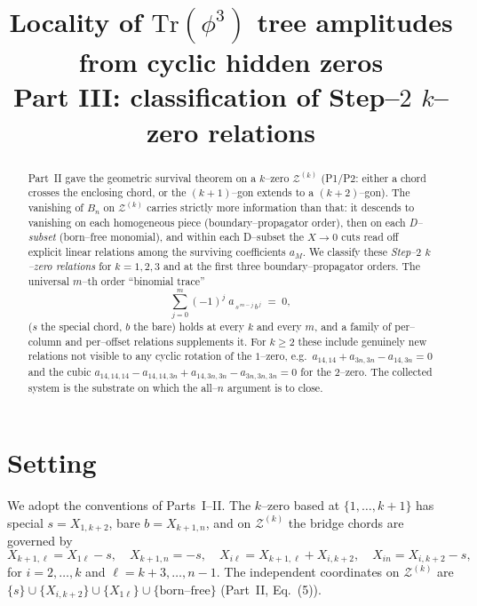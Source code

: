 \documentclass[11pt]{article}
\title{\vspace{-1.2em}Locality of $\mathrm{Tr}(\phi^3)$ tree amplitudes from cyclic hidden zeros\\[2pt]
\large Part III: classification of Step--$2$ $k$--zero relations}
\date{}
\author{}
\theoremstyle{definition}
\newcommand{\Z}{\mathcal{Z}}
\newcommand{\X}[1]{X_{#1}}
\begin{document}
\maketitle
\vspace{-3.2em}

\begin{abstract}
\noindent Part~II gave the geometric survival theorem on a $k$--zero $\Z^{(k)}$ (P1/P2: either a
chord crosses the enclosing chord, or the $(k{+}1)$--gon extends to a $(k{+}2)$--gon). The
vanishing of $B_n$ on
$\Z^{(k)}$ carries strictly more information than that: it descends to vanishing on each homogeneous
piece (boundary--propagator order), then on each \emph{D--subset} (born--free monomial), and within
each D--subset the $X\!\to\!0$ cuts read off explicit linear relations among the surviving
coefficients $a_M$. We classify these \emph{Step--$2$ $k$--zero relations} for $k=1,2,3$ and at the
first three boundary--propagator orders. The universal $m$--th order ``binomial trace''
\begin{equation*}
  \sum_{j=0}^{m}(-1)^{j}\;a_{\,s^{\,m-j}\,b^{\,j}}\;=\;0,
\end{equation*}
($s$ the special chord, $b$ the bare) holds at every $k$ and every $m$, and a family of per--column
and per--offset relations supplements it. For $k\ge2$ these include genuinely new relations not
visible to any cyclic rotation of the $1$--zero, e.g.\ $a_{14,14}+a_{3n,3n}-a_{14,3n}=0$ and the
cubic $a_{14,14,14}-a_{14,14,3n}+a_{14,3n,3n}-a_{3n,3n,3n}=0$ for the $2$--zero. The collected
system is the substrate on which the all--$n$ argument is to close.
\end{abstract}

\section{Setting}
We adopt the conventions of Parts~I--II. The $k$--zero based at $\{1,\dots,k{+}1\}$ has special
$s=\X{1,k+2}$, bare $b=\X{k+1,n}$, and on $\Z^{(k)}$ the bridge chords are governed by
\begin{equation}\label{eq:constr}
  \X{k+1,\ell}=\X{1\ell}-s,\quad \X{k+1,n}=-s,\quad
  \X{i\ell}=\X{k+1,\ell}+\X{i,k+2},\quad \X{in}=\X{i,k+2}-s,
\end{equation}
for $i=2,\dots,k$ and $\ell=k{+}3,\dots,n{-}1$. The independent coordinates on $\Z^{(k)}$ are
$\{s\}\cup\{\X{i,k+2}\}\cup\{\X{1\ell}\}\cup\{\text{born--free}\}$ (Part~II, Eq.~(5)).
\end{document}

